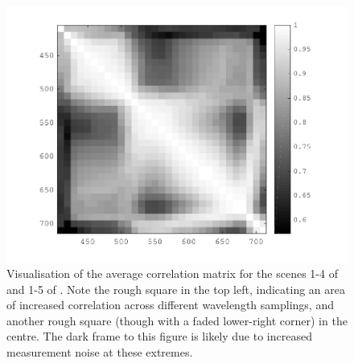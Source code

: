 \begin{figure}[htbp]
 \includegraphics[max width=\textwidth]{figs/comp/nat_cor/foster.pdf}
 \caption{Visualisation of the average correlation matrix for the scenes 1-4 of \citep{nascimento_statistics_2002} and 1-5 of \citep{foster_frequency_2006}. Note the rough square in the top left, indicating an area of increased correlation across different wavelength samplings, and another rough square (though with a faded lower-right corner) in the centre. The dark frame to this figure is likely due to increased measurement noise at these extremes.}
 \label{fig:foster}
\end{figure} %


